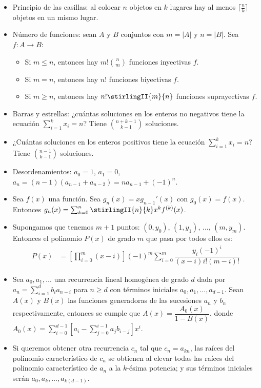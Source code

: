 	\begin{itemize}
		\item Principio de las casillas: al colocar $n$ objetos en $k$ lugares hay al menos $\lceil \frac{n}{k} \rceil$ objetos en un mismo lugar.
		\item Número de funciones: sean $A$ y $B$ conjuntos con $m=|A|$ y $n=|B|$. Sea $f : A \to B$:
		\begin{itemize}
			\item Si $m \leq n$, entonces hay $\displaystyle m!\binom{n}{m}$ funciones inyectivas $f$.
			\item Si $m=n$, entonces hay $n!$ funciones biyectivas $f$.
			\item Si $m \geq n$, entonces hay $n!\stirlingII{m}{n}$ funciones suprayectivas $f$.
		\end{itemize}
		\item Barras y estrellas: ¿cuántas soluciones en los enteros no negativos tiene la ecuación $\displaystyle \sum_{i=1}^{k}x_i = n$? Tiene  $\displaystyle \binom{n+k-1}{k-1}$ soluciones.
		\item ¿Cuántas soluciones en los enteros positivos tiene la ecuación $\displaystyle \sum_{i=1}^{k}x_i = n$? Tiene  $\displaystyle \binom{n-1}{k-1}$ soluciones.
		\item Desordenamientos: $a_0=1$, $a_1=0$, $a_n=(n-1)(a_{n-1}+a_{n-2})=na_{n-1}+(-1)^n$.
		\item Sea $f(x)$ una función. Sea $g_n(x)=x g_{n-1}'(x)$ con $g_0(x)=f(x)$. Entonces $g_n(x)=\sum_{k=0}^{n} \stirlingII{n}{k} x^k f^{(k)}(x)$.
		\item Supongamos que tenemos $m+1$ puntos: $(0, y_0)$, $(1, y_1)$, $\ldots$, $(m, y_m)$. Entonces el polinomio $P(x)$ de grado $m$ que pasa por todos ellos es:
		\begin{align*}
			P(x) &= \left[ \prod_{i=0}^{m}(x-i) \right] (-1)^m \sum_{i=0}^{m} \dfrac{y_i (-1)^i}{(x-i)i!(m-i)!}
		\end{align*}
		\item Sea $a_0, a_1, \ldots$ una recurrencia lineal homogénea de grado $d$ dada por $\displaystyle a_n=\sum_{i=1}^{d} b_i a_{n-i}$ para $n \geq d$ con términos iniciales $a_0, a_1, \ldots, a_{d-1}$. Sean $A(x)$ y $B(x)$ las funciones generadoras de las sucesiones $a_n$ y $b_n$ respectivamente, entonces se cumple que $A(x)=\dfrac{A_0(x)}{1-B(x)}$, donde $\displaystyle A_0(x)=\sum_{i=0}^{d-1} \left[ a_i - \sum_{j=0}^{i-1}a_j b_{i-j} \right] x^i$.
		\item Si queremos obtener otra recurrencia $c_n$ tal que $c_n=a_{kn}$, las raíces del polinomio característico de $c_n$ se obtienen al elevar todas las raíces del polinomio característico de $a_n$ a la $k$-ésima potencia; y sus términos iniciales serán $a_0, a_k, \ldots, a_{k(d-1)}$.
	\end{itemize}

